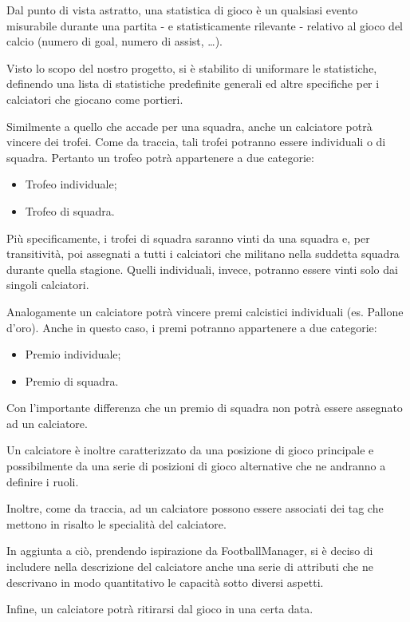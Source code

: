 Dal punto di vista astratto, una statistica di gioco è un qualsiasi evento misurabile durante
una partita - e statisticamente rilevante - relativo al gioco del calcio
(numero di goal, numero di assist, \dots).

Visto lo scopo del nostro progetto, si è stabilito di uniformare le statistiche, definendo una
lista di statistiche predefinite generali ed altre specifiche per i calciatori che giocano
come portieri.

Similmente a quello che accade per una squadra, anche un calciatore potrà vincere dei trofei.
Come da traccia, tali trofei potranno essere individuali o di squadra.
Pertanto un trofeo potrà appartenere a due categorie:
\begin{itemize}
	\item Trofeo individuale;
	\item Trofeo di squadra.
\end{itemize}

Più specificamente, i trofei di squadra saranno vinti da una squadra e, per transitività, poi
assegnati a tutti i calciatori che militano nella suddetta squadra durante quella stagione.
Quelli individuali, invece, potranno essere vinti solo dai singoli calciatori.

Analogamente un calciatore potrà vincere premi calcistici individuali (es. Pallone d'oro).
Anche in questo caso, i premi potranno appartenere a due categorie:
\begin{itemize}
	\item Premio individuale;
	\item Premio di squadra.
\end{itemize}

Con l'importante differenza che un premio di squadra non potrà essere assegnato ad un
calciatore.

Un calciatore è inoltre caratterizzato da una posizione di gioco principale e possibilmente da una
serie di posizioni di gioco alternative che ne andranno a definire i ruoli.

Inoltre, come da traccia, ad un calciatore possono essere associati dei tag che mettono in
risalto le specialità del calciatore.

In aggiunta a ciò, prendendo ispirazione da FootballManager, si è deciso di includere nella
descrizione del calciatore anche una serie di attributi che ne descrivano in modo quantitativo
le capacità sotto diversi aspetti.

Infine, un calciatore potrà ritirarsi dal gioco in una certa data.

